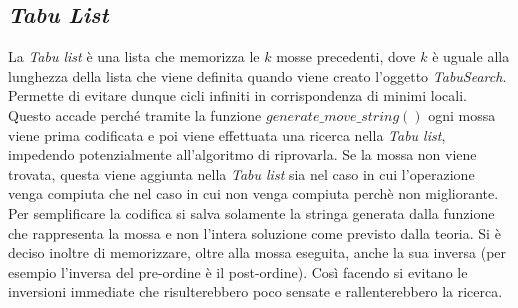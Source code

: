 \subsection{\textit{Tabu List}}
\label{sec:tabu-list}
\noindent La \textit{Tabu list} è una lista che memorizza le $k$ mosse precedenti, dove $k$ è uguale
alla lunghezza della lista che viene definita quando viene creato l'oggetto \textit{TabuSearch}.\\
Permette di evitare dunque cicli infiniti in corrispondenza
di minimi locali. Questo accade perché tramite la funzione
$generate\_move\_string()$ ogni mossa
viene prima codificata e poi viene effettuata una ricerca nella \textit{Tabu list}, impedendo potenzialmente all’algoritmo di riprovarla.
Se la mossa non viene trovata, questa viene aggiunta nella \textit{Tabu list} sia nel caso in cui l'operazione venga compiuta che nel caso in cui non
venga compiuta perchè non migliorante.\\
Per semplificare la codifica si salva solamente la stringa generata dalla funzione che rappresenta la mossa e non l’intera
soluzione come previsto dalla teoria.
Si è deciso inoltre di memorizzare, oltre alla mossa eseguita, anche la sua inversa
(per esempio l'inversa del pre-ordine è il post-ordine). Così facendo si
evitano le inversioni immediate che risulterebbero poco sensate e rallenterebbero la ricerca.

